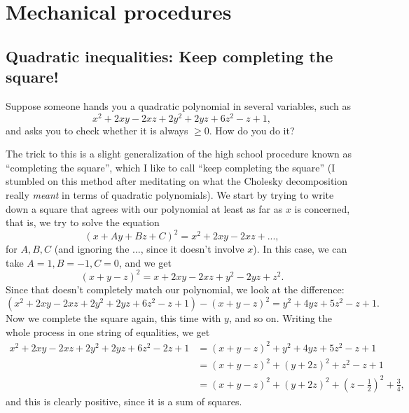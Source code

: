 \section{Mechanical procedures}

\subsection{Quadratic inequalities: Keep completing the square!}

Suppose someone hands you a quadratic polynomial in several variables, such as
\[
x^2 + 2xy - 2xz + 2y^2 + 2yz + 6z^2 - z + 1,
\]
and asks you to check whether it is always $\ge 0$. How do you do it?

The trick to this is a slight generalization of the high school procedure known as ``completing the square'', which I like to call ``keep completing the square'' (I stumbled on this method after meditating on what the Cholesky decomposition really \emph{meant} in terms of quadratic polynomials). We start by trying to write down a square that agrees with our polynomial at least as far as $x$ is concerned, that is, we try to solve the equation
\[
(x + Ay + Bz + C)^2 = x^2 + 2xy - 2xz + ...,
\]
for $A,B,C$ (and ignoring the $...$, since it doesn't involve $x$). In this case, we can take $A = 1, B = -1, C = 0$, and we get
\[
(x + y - z)^2 = x + 2xy - 2xz + y^2 - 2yz + z^2.
\]
Since that doesn't completely match our polynomial, we look at the difference:
\[
(x^2 + 2xy - 2xz + 2y^2 + 2yz + 6z^2 - z + 1) - (x + y - z)^2 = y^2 + 4yz + 5z^2 - z + 1.
\]
Now we complete the square again, this time with $y$, and so on. Writing the whole process in one string of equalities, we get
\begin{align*}
x^2 + 2xy - 2xz + 2y^2 + 2yz + 6z^2 - 2z + 1 &= (x + y - z)^2 + y^2 + 4yz + 5z^2 - z + 1\\
&= (x + y - z)^2 + (y + 2z)^2 + z^2 - z + 1\\
&= (x + y - z)^2 + (y + 2z)^2 + (z - \tfrac{1}{2})^2 + \tfrac{3}{4},
\end{align*}
and this is clearly positive, since it is a sum of squares.

